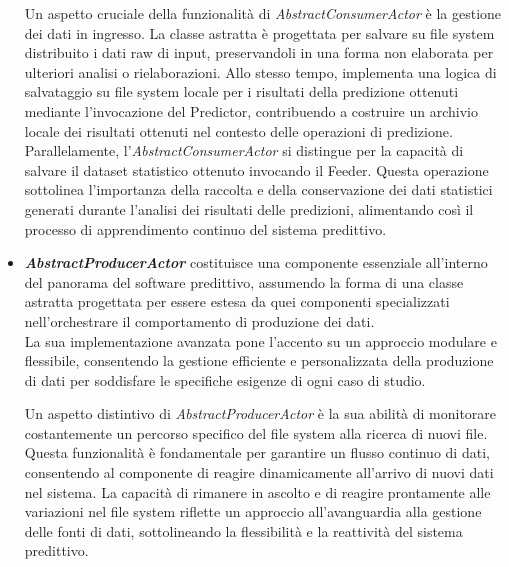 \begin{itemize}
    Un aspetto cruciale della funzionalità di \textit{AbstractConsumerActor} è la gestione dei dati in ingresso.
    La classe astratta è progettata per salvare su file system distribuito i dati raw di input, preservandoli in una forma non elaborata per ulteriori analisi o rielaborazioni.
    Allo stesso tempo, implementa una logica di salvataggio su file system locale per i risultati della predizione ottenuti mediante l'invocazione del Predictor, contribuendo a costruire un archivio locale dei risultati ottenuti nel contesto delle operazioni di predizione.\\
    Parallelamente, l'\textit{AbstractConsumerActor} si distingue per la capacità di salvare il dataset statistico ottenuto invocando il Feeder.
    Questa operazione sottolinea l'importanza della raccolta e della conservazione dei dati statistici generati durante l'analisi dei risultati delle predizioni, alimentando così il processo di apprendimento continuo del sistema predittivo.
    \item \textit{\textbf{AbstractProducerActor}} costituisce una componente essenziale all'interno del panorama del software predittivo, assumendo la forma di una classe astratta progettata per essere estesa da quei componenti specializzati nell'orchestrare il comportamento di produzione dei dati. \\
    La sua implementazione avanzata pone l'accento su un approccio modulare e flessibile, consentendo la gestione efficiente e personalizzata della produzione di dati per soddisfare le specifiche esigenze di ogni caso di studio. 

    Un aspetto distintivo di \textit{AbstractProducerActor} è la sua abilità di monitorare costantemente un percorso specifico del file system alla ricerca di nuovi file.
    Questa funzionalità è fondamentale per garantire un flusso continuo di dati, consentendo al componente di reagire dinamicamente all'arrivo di nuovi dati nel sistema.
    La capacità di rimanere in ascolto e di reagire prontamente alle variazioni nel file system riflette un approccio all'avanguardia alla gestione delle fonti di dati, sottolineando la flessibilità e la reattività del sistema predittivo. 


\end{itemize}
